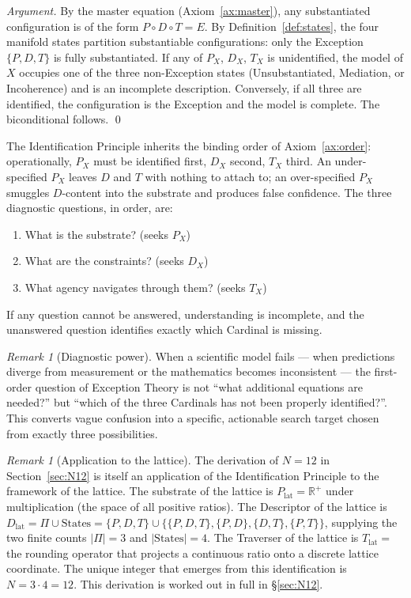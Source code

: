 \documentclass[11pt,a4paper]{article}
\theoremstyle{definition}
\theoremstyle{remark}
\newtheorem{remark}[theorem]{Remark}
\newcommand{\R}{\mathbb{R}}
\begin{document}
\begin{proof}[Argument]
By the master equation (Axiom~\ref{ax:master}), any substantiated configuration is of the form $P\circ D\circ T = E$. By Definition~\ref{def:states}, the four manifold states partition substantiable configurations: only the Exception $\{P,D,T\}$ is fully substantiated. If any of $P_{X}$, $D_{X}$, $T_{X}$ is unidentified, the model of $X$ occupies one of the three non-Exception states (Unsubstantiated, Mediation, or Incoherence) and is an incomplete description. Conversely, if all three are identified, the configuration is the Exception and the model is complete. The biconditional follows. \qed
\end{proof}

The Identification Principle inherits the binding order of Axiom~\ref{ax:order}: operationally, $P_{X}$ must be identified first, $D_{X}$ second, $T_{X}$ third. An under-specified $P_{X}$ leaves $D$ and $T$ with nothing to attach to; an over-specified $P_{X}$ smuggles $D$-content into the substrate and produces false confidence. The three diagnostic questions, in order, are:
\begin{enumerate}[leftmargin=*,label=(\roman*)]
\item What is the substrate? (seeks $P_{X}$)
\item What are the constraints? (seeks $D_{X}$)
\item What agency navigates through them? (seeks $T_{X}$)
\end{enumerate}
If any question cannot be answered, understanding is incomplete, and the unanswered question identifies exactly which Cardinal is missing.

\begin{remark}[Diagnostic power]
When a scientific model fails --- when predictions diverge from measurement or the mathematics becomes inconsistent --- the first-order question of Exception Theory is not ``what additional equations are needed?'' but ``which of the three Cardinals has not been properly identified?''. This converts vague confusion into a specific, actionable search target chosen from exactly three possibilities.
\end{remark}

\begin{remark}[Application to the lattice]\label{rem:id-lattice}
The derivation of $N=12$ in Section~\ref{sec:N12} is itself an application of the Identification Principle to the framework of the lattice. The substrate of the lattice is $P_{\mathrm{lat}} = \R^{+}$ under multiplication (the space of all positive ratios). The Descriptor of the lattice is $D_{\mathrm{lat}} = \Pi \cup \mathrm{States} = \{P,D,T\} \cup \{\{P,D,T\},\{P,D\},\{D,T\},\{P,T\}\}$, supplying the two finite counts $|\Pi|=3$ and $|\mathrm{States}|=4$. The Traverser of the lattice is $T_{\mathrm{lat}} = $ the rounding operator that projects a continuous ratio onto a discrete lattice coordinate. The unique integer that emerges from this identification is $N = 3\cdot 4 = 12$. This derivation is worked out in full in \S\ref{sec:N12}.
\end{remark}
\end{document}
